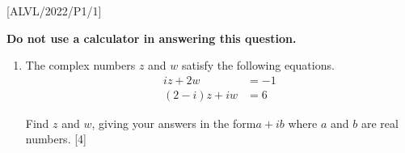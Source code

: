 \item {[}ALVL/2022/P1/1{]}

\textbf{Do not use a calculator in answering this question. }
\begin{enumerate}
\item The complex numbers $z$ and $w$ satisfy the following equations.
\begin{align*}
iz+2w & =-1\\
(2-i)z+iw & =6
\end{align*}

Find $z$ and $w$, giving your answers in the form$a+ib$ where $a$
and $b$ are real numbers. \hfill{}{[}4{]}
\end{enumerate}
